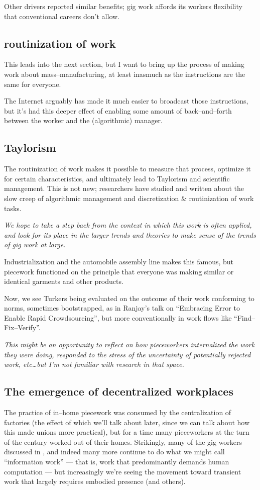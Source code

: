\documentclass{sigchi}
\begin{document}
Other drivers reported similar benefits;
gig work affords its workers flexibility that conventional careers don't allow.

\subsection{routinization of work}
This leads into the next section, but I want to bring up the process of
making work about mass--manufacturing, at least inasmuch as
the instructions are the same for everyone.

The Internet arguably has made it much easier to broadcast those instructions,
but it's had this deeper effect of enabling some amount of back--and--forth
between the worker and the (algorithmic) manager.

\subsection{Taylorism}
The routinization of work makes it possible to measure that process,
optimize it for certain characteristics, and ultimately
lead to Taylorism and scientific management.
This is not new;
researchers have studied and written about the slow creep of
algorithmic management and 
discretization \& routinization of work tasks.

\textit{We hope to take a step back from the context in which this work is often applied, and
look for its place in the larger trends and theories
to make sense of the trends of gig work at large.}

Industrialization and the automobile assembly line makes this famous,
but piecework functioned on the principle that everyone was making similar
or identical
garments and other products.

Now, we see Turkers being evaluated on the outcome of their work conforming to norms,
sometimes bootstrapped,
as in Ranjay's talk on 
``Embracing Error to Enable Rapid Crowdsourcing'',
but more conventionally in work flows like ``Find--Fix--Verify''.

\textit{This might be an opportunity to reflect on
how pieceworkers internalized the work they were doing,
responded to the stress of the uncertainty of potentially rejected work,
etc\dots but I'm not familiar with research in that space.}

\subsection{The emergence of decentralized workplaces}
The practice of in--home piecework was consumed by
the centralization of factories
(the effect of which we'll talk about later, since
we can talk about how this made unions more practical),
but for a time many pieceworkers
at the turn of the  century
worked out of their homes.
Strikingly, many of the gig workers
\citeauthor{crowdworkFuture}
discussed in
\citeyear{crowdworkFuture},
and indeed many more continue to do what we might call ``information work''
--- that is, work that predominantly demands human computation ---
but increasingly we're seeing the movement toward transient work that largely requires embodied presence
\cite{uberAlgorithm} (and others).
\end{document}
